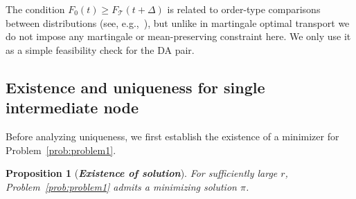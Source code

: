 \documentclass[11pt]{article}
\newcommand{\calT}{{\mathcal T}}
\newtheorem{proposition}{Proposition}
\begin{document}
The condition $F_{0}(t)\ge F_{\calT}(t+\Delta)$
is related to order-type comparisons between distributions
(see, e.g.,~\cite{hadar1969rules,shaked2007stochastic}),
but unlike in martingale optimal transport \cite{beiglbock2016problem} we do not impose any
martingale or mean-preserving constraint here. We only use it as
a simple feasibility check for the DA pair.

\subsection{Existence and uniqueness for single intermediate node}
Before analyzing uniqueness, we first establish the existence of a minimizer for Problem~\ref{prob:problem1}.

\begin{proposition}[\bf \textit{Existence of solution}]\label{prop:existence}
For sufficiently large $r$, Problem~\ref{prob:problem1} admits a minimizing solution $\pi$.
\end{proposition}
\end{document}
